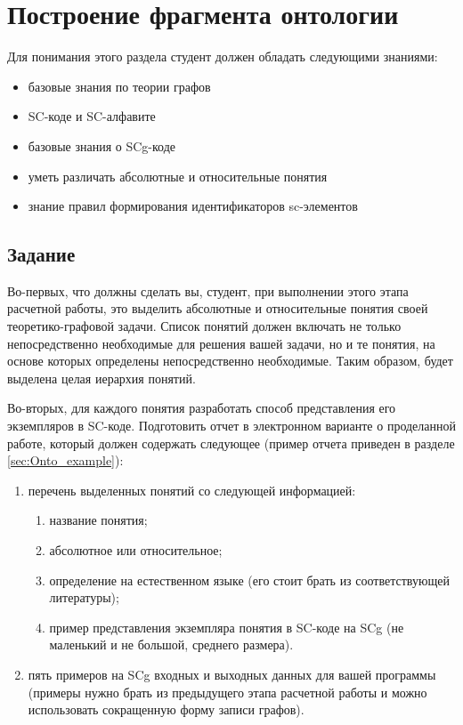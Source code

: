 
\chapter{Построение фрагмента онтологии}
\label{cha:Onto}

Для понимания этого раздела студент должен обладать следующими
знаниями:

\begin{itemize}
\item базовые знания по теории графов
\item SC-коде и SC-алфавите
\item базовые знания о SCg-коде
\item уметь различать абсолютные и относительные понятия
\item знание правил формирования идентификаторов sc-элементов
\end{itemize}

\section{Задание}
\label{sec:Onto_task}

Во-первых, что должны сделать вы, студент, при выполнении
этого этапа расчетной работы, это выделить абсолютные и относительные
понятия своей теоретико-графовой задачи. Список понятий должен
включать не только непосредственно необходимые для решения вашей
задачи, но и те понятия, на основе которых определены непосредственно
необходимые. Таким образом, будет выделена целая иерархия понятий.

Во-вторых, для каждого понятия разработать способ представления его
экземпляров в SC-коде. Подготовить отчет в электронном варианте о
проделанной работе, который должен содержать следующее (пример отчета
приведен в разделе \ref{sec:Onto_example}):

\begin{enumerate}
\item перечень выделенных понятий со следующей информацией:
  \begin{enumerate}
  \item название понятия;
  \item абсолютное или относительное;
  \item определение на естественном языке (его стоит брать из соответствующей
    литературы);
  \item пример представления экземпляра понятия в SC-коде на
    SCg (не маленький и не большой, среднего размера). 
  \end{enumerate}
\item пять примеров на SCg входных и выходных данных для вашей
  программы (примеры нужно брать из предыдущего этапа расчетной
  работы и можно использовать сокращенную форму записи графов).
\end{enumerate}

